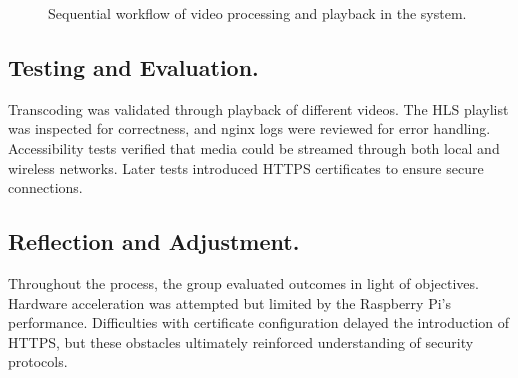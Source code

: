 \documentclass[11pt]{article}
\begin{document}
\begin{figure}[H]
\centering
{}
\caption{Sequential workflow of video processing and playback in the system.}
\label{fig:workflow}
\end{figure}

\subsection{Testing and Evaluation.} Transcoding was validated through playback of different videos. The HLS playlist was inspected for correctness, and nginx logs were reviewed for error handling. Accessibility tests verified that media could be streamed through both local and wireless networks. Later tests introduced HTTPS certificates to ensure secure connections.

\subsection{Reflection and Adjustment.} Throughout the process, the group evaluated outcomes in light of objectives. Hardware acceleration was attempted but limited by the Raspberry Pi’s performance. Difficulties with certificate configuration delayed the introduction of HTTPS, but these obstacles ultimately reinforced understanding of security protocols.
\end{document}
